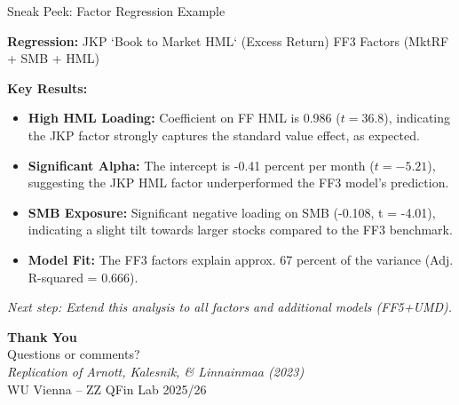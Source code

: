 \documentclass[t]{beamer}
\begin{document}
\begin{frame}{Sneak Peek: Factor Regression Example}

    \textbf{Regression:} JKP `Book to Market HML` (Excess Return) FF3 Factors (MktRF + SMB + HML)

    \vspace{0.5cm}
    \textbf{Key Results:}
    \begin{itemize}
        \item \textbf{High HML Loading:} Coefficient on FF HML is 0.986 ($t = 36.8$), indicating the JKP factor strongly captures the standard value effect, as expected.
        \item \textbf{Significant Alpha:} The intercept is -0.41 percent per month ($t = -5.21$), suggesting the JKP HML factor underperformed the FF3 model's prediction.
        \item \textbf{SMB Exposure:} Significant negative loading on SMB (-0.108, t = -4.01), indicating a slight tilt towards larger stocks compared to the FF3 benchmark.
        \item \textbf{Model Fit:} The FF3 factors explain approx. 67 percent of the variance (Adj. R-squared = 0.666).
    \end{itemize}

    \vspace{0.5cm}
    \textit{Next step: Extend this analysis to all factors and additional models (FF5+UMD).}

\end{frame}


\begin{frame}[plain]
    \centering
    \vspace{2cm}
    {\Huge \textbf{Thank You}} \\[0.5cm]
    \Large Questions or comments? \\[1cm]
    \normalsize
    \textit{Replication of Arnott, Kalesnik, \& Linnainmaa (2023)} \\
    WU Vienna – ZZ QFin Lab 2025/26 
\end{frame}
\end{document}

